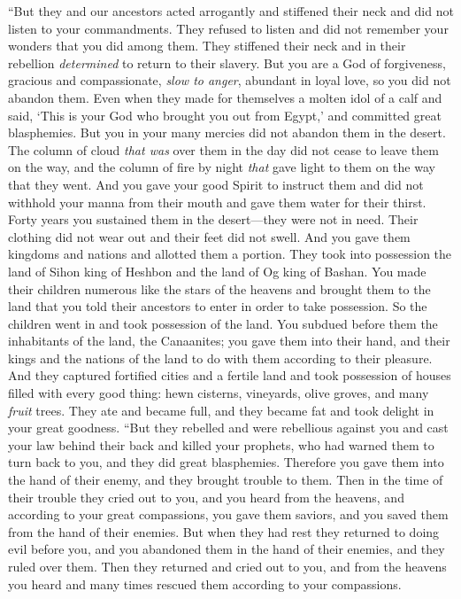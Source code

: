 \begin{biblechapter}
\verse “But they and our ancestors acted arrogantly and stiffened their neck and did not listen to your commandments.
\verse They refused to listen and did not remember your wonders that you did among them. They stiffened their neck and in their rebellion \textit{determined} to return to their slavery. But you are a God of forgiveness, gracious and compassionate, \textit{slow to anger}, abundant in loyal love, so you did not abandon them.
\verse Even when they made for themselves a molten idol of a calf and said, ‘This is your God who brought you out from Egypt,’ and committed great blasphemies.
\verse But you in your many mercies did not abandon them in the desert. The column of cloud \textit{that was} over them in the day did not cease to leave them on the way, and the column of fire by night \textit{that} gave light to them on the way that they went.
\verse And you gave your good Spirit to instruct them and did not withhold your manna from their mouth and gave them water for their thirst.
\verse Forty years you sustained them in the desert—they were not in need. Their clothing did not wear out and their feet did not swell.
\verse And you gave them kingdoms and nations and allotted them a portion. They took into possession the land of Sihon king of Heshbon and the land of Og king of Bashan.
\verse You made their children numerous like the stars of the heavens and brought them to the land that you told their ancestors to enter in order to take possession.
\verse So the children went in and took possession of the land. You subdued before them the inhabitants of the land, the Canaanites; you gave them into their hand, and their kings and the nations of the land to do with them according to their pleasure.
\verse And they captured fortified cities and a fertile land and took possession of houses filled with every good thing: hewn cisterns, vineyards, olive groves, and many \textit{fruit} trees. They ate and became full, and they became fat and took delight in your great goodness.
\verse “But they rebelled and were rebellious against you and cast your law behind their back and killed your prophets, who had warned them to turn back to you, and they did great blasphemies.
\verse Therefore you gave them into the hand of their enemy, and they brought trouble to them. Then in the time of their trouble they cried out to you, and you heard from the heavens, and according to your great compassions, you gave them saviors, and you saved them from the hand of their enemies.
\verse But when they had rest they returned to doing evil before you, and you abandoned them in the hand of their enemies, and they ruled over them. Then they returned and cried out to you, and from the heavens you heard and many times rescued them according to your compassions.

\end{biblechapter}
